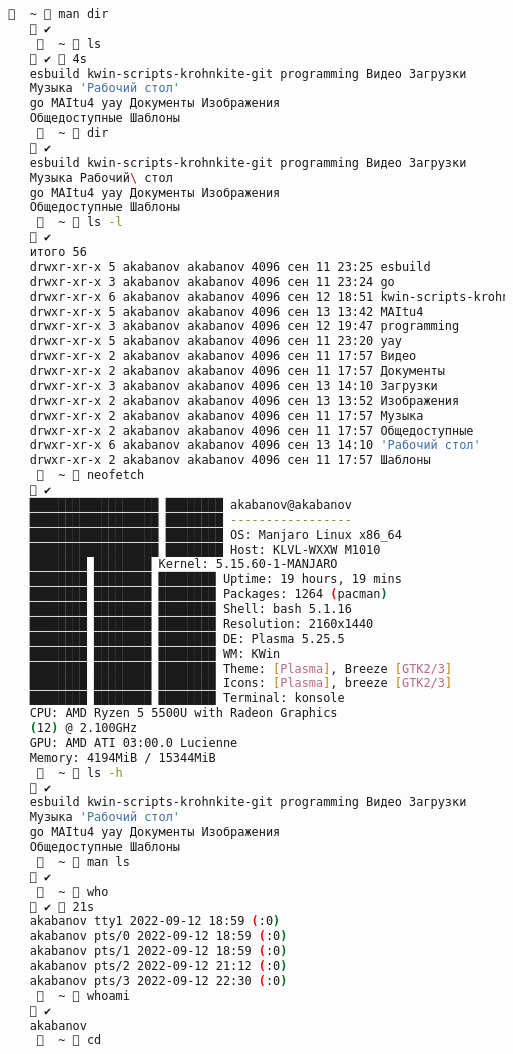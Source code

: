\begin{lstlisting}[language=bash]
	     ~  man dir
	 ✔
	     ~  ls
	 ✔  4s  
	esbuild kwin-scripts-krohnkite-git programming Видео Загрузки
	Музыка 'Рабочий стол'
	go MAItu4 yay Документы Изображения
	Общедоступные Шаблоны
	     ~  dir
	 ✔
	esbuild kwin-scripts-krohnkite-git programming Видео Загрузки
	Музыка Рабочий\ стол
	go MAItu4 yay Документы Изображения
	Общедоступные Шаблоны
	     ~  ls -l
	 ✔
	итого 56
	drwxr-xr-x 5 akabanov akabanov 4096 сен 11 23:25 esbuild
	drwxr-xr-x 3 akabanov akabanov 4096 сен 11 23:24 go
	drwxr-xr-x 6 akabanov akabanov 4096 сен 12 18:51 kwin-scripts-krohnkite-git
	drwxr-xr-x 5 akabanov akabanov 4096 сен 13 13:42 MAItu4
	drwxr-xr-x 3 akabanov akabanov 4096 сен 12 19:47 programming
	drwxr-xr-x 5 akabanov akabanov 4096 сен 11 23:20 yay
	drwxr-xr-x 2 akabanov akabanov 4096 сен 11 17:57 Видео
	drwxr-xr-x 2 akabanov akabanov 4096 сен 11 17:57 Документы
	drwxr-xr-x 3 akabanov akabanov 4096 сен 13 14:10 Загрузки
	drwxr-xr-x 2 akabanov akabanov 4096 сен 13 13:52 Изображения
	drwxr-xr-x 2 akabanov akabanov 4096 сен 11 17:57 Музыка
	drwxr-xr-x 2 akabanov akabanov 4096 сен 11 17:57 Общедоступные
	drwxr-xr-x 6 akabanov akabanov 4096 сен 13 14:10 'Рабочий стол'
	drwxr-xr-x 2 akabanov akabanov 4096 сен 11 17:57 Шаблоны
	     ~  neofetch
	 ✔
	██████████████████ ████████ akabanov@akabanov
	██████████████████ ████████ -----------------
	██████████████████ ████████ OS: Manjaro Linux x86_64
	██████████████████ ████████ Host: KLVL-WXXW M1010
	████████ ████████ Kernel: 5.15.60-1-MANJARO
	████████ ████████ ████████ Uptime: 19 hours, 19 mins
	████████ ████████ ████████ Packages: 1264 (pacman)
	████████ ████████ ████████ Shell: bash 5.1.16
	████████ ████████ ████████ Resolution: 2160x1440
	████████ ████████ ████████ DE: Plasma 5.25.5
	████████ ████████ ████████ WM: KWin
	████████ ████████ ████████ Theme: [Plasma], Breeze [GTK2/3]
	████████ ████████ ████████ Icons: [Plasma], breeze [GTK2/3]
	████████ ████████ ████████ Terminal: konsole
	CPU: AMD Ryzen 5 5500U with Radeon Graphics
	(12) @ 2.100GHz
	GPU: AMD ATI 03:00.0 Lucienne
	Memory: 4194MiB / 15344MiB
	     ~  ls -h
	 ✔
	esbuild kwin-scripts-krohnkite-git programming Видео Загрузки
	Музыка 'Рабочий стол'
	go MAItu4 yay Документы Изображения
	Общедоступные Шаблоны
	     ~  man ls
	 ✔
	     ~  who
	 ✔  21s  
	akabanov tty1 2022-09-12 18:59 (:0)
	akabanov pts/0 2022-09-12 18:59 (:0)
	akabanov pts/1 2022-09-12 18:59 (:0)
	akabanov pts/2 2022-09-12 21:12 (:0)
	akabanov pts/3 2022-09-12 22:30 (:0)
	     ~  whoami
	 ✔
	akabanov
	     ~  cd

\end{lstlisting}
